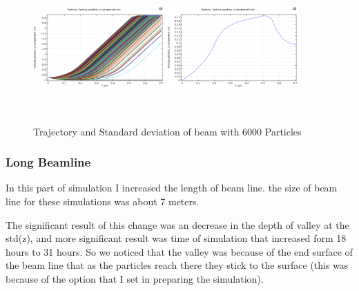 \documentclass{article}
\begin{document}
\begin{figure}[h]
\centering
\includegraphics[width=50mm, height=50mm]{sim-in-6000}
\includegraphics[width=50mm, height=50mm]{sim-std-6000}
\caption{Trajectory and Standard deviation of beam with 6000 Particles}
\end{figure}

\subsubsection{Long Beamline}
In this part of simulation I increased the length of beam line. the size of beam line for these simulations was about 7 meters. 

The significant result of this change was an decrease in the depth of valley at the std(z), and more significant result was time of simulation that increased form 18 hours to 31 hours.
 So we noticed that the valley was because of the end surface of the beam line that as the particles reach there they stick to the surface (this was because of the option that I set in preparing the simulation).
 
\end{document}
